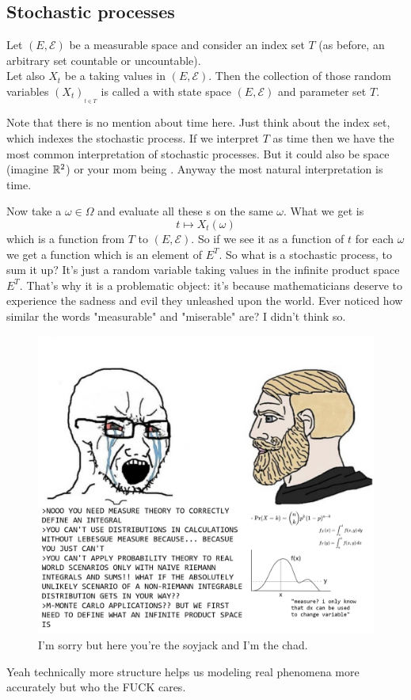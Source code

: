 \documentclass{report}
\begin{document}
\subsection{Stochastic processes}
\begin{definition}
	Let $(E,\mathscr{E})$ be a measurable space and consider an index set $T$ (as before, an arbitrary set countable or uncountable).\\
	Let also $X_t$ be a \rv{} taking values in $(E,\mathscr{E})$. Then the collection of those random variables $(X_t)_{_{t\in T}}$ is called a  with state space $(E,\mathscr{E})$ and parameter set $T$.
\end{definition}
Note that there is no mention about time here. Just think about the index set, which indexes the stochastic process. If we interpret $T$ as time then we have the most common interpretation of stochastic processes. But it could also be space (imagine $\mathbb{R}^2$) or your mom being . Anyway the most natural interpretation is time.\par
Now take a $\omega\in\Omega$ and evaluate all these \rv s on the same $\omega$. What we get is
\[t\mapsto X_t(\omega)\]
which is a function from $T$ to $(E,\mathscr{E})$. So if we see it as a function of $t$ for each $\omega$ we get a function which is an element of $E^T$. So what is a stochastic process, to sum it up? It's just a random variable taking values in the infinite product space $E^T$. That's why it is a problematic object: it's because mathematicians deserve to experience the sadness and evil they unleashed upon the world. Ever noticed how similar the words "measurable" and "miserable" are? I didn't think so. 
\begin{figure}
	\centering
	\includegraphics[width=0.7\linewidth]{ILMEMINO}
	\caption{I'm sorry but here you're the soyjack and I'm the chad.}
	\label{fig:ilmemino}
\end{figure}
Yeah technically more structure helps us modeling real phenomena more accurately but who the FUCK cares. 
\end{document}
